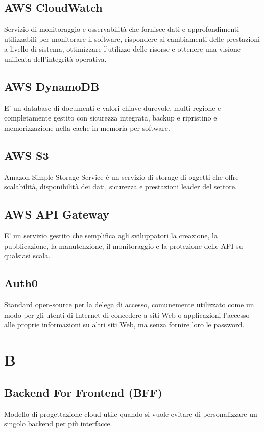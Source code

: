 \subsection*{AWS CloudWatch}
Servizio di monitoraggio e osservabilità che fornisce dati e approfondimenti utilizzabili per monitorare il software, rispondere ai cambiamenti delle prestazioni a livello di sistema, ottimizzare l'utilizzo delle risorse e ottenere una visione unificata dell'integrità operativa.

\subsection*{AWS DynamoDB}
E' un database di documenti e valori-chiave durevole, multi-regione e completamente gestito con sicurezza integrata, backup e ripristino e memorizzazione nella cache in memoria per software.

\subsection*{AWS S3}
Amazon Simple Storage Service è un servizio di storage di oggetti che offre scalabilità, disponibilità dei dati, sicurezza e prestazioni leader del settore.

\subsection*{AWS API Gateway}
E' un servizio gestito che semplifica agli sviluppatori la creazione, la pubblicazione, la manutenzione, il monitoraggio e la protezione delle API su qualsiasi scala.

\subsection*{Auth0}
Standard open-source per la delega di accesso, comunemente utilizzato come un modo per gli utenti di Internet di concedere a siti Web o applicazioni l'accesso alle proprie informazioni su altri siti Web, ma senza fornire loro le password.

\newpage
\section{B}
\subsection*{Backend For Frontend (BFF)}
Modello di progettazione cloud utile quando si vuole evitare di personalizzare un singolo backend per più interfacce.

